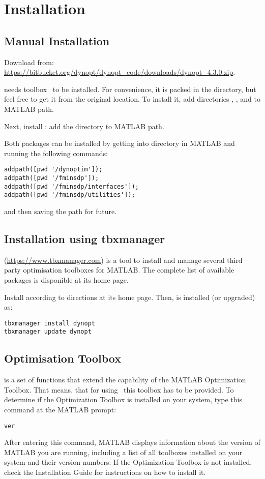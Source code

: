 \section{Installation}
\label{sec:instdynopt}

\subsection{Manual Installation}
Download  from:\\
\url{https://bitbucket.org/dynopt/dynopt_code/downloads/dynopt_4.3.0.zip}. 

 needs  toolbox~\citep{fminsdp} to be
installed. For convenience, it is packed in the 
directory, but feel free to get it from the original location. To
install it, add directories ,
, and  to MATLAB path.

Next, install : add the directory  to
MATLAB path. 

Both packages can be installed by getting into 
directory in MATLAB and running the following commands:
\begin{verbatim}
addpath([pwd '/dynoptim']);
addpath([pwd '/fminsdp']);
addpath([pwd '/fminsdp/interfaces']);
addpath([pwd '/fminsdp/utilities']);
\end{verbatim}
and then saving the path for future.

\subsection{Installation using tbxmanager}
 (\url{https://www.tbxmanager.com}) is a tool to
install and manage several third party optimisation toolboxes for
MATLAB.  The complete list of available packages is disponible at its
home page.

Install  according to directions at its home
page. Then,  is installed (or upgraded) as:
\begin{verbatim}
tbxmanager install dynopt
tbxmanager update dynopt
\end{verbatim}

\subsection{Optimisation Toolbox}
 is a set of functions that extend the capability of the
MATLAB Optimization Toolbox. That means, that for using~
this toolbox has to be provided. To determine if the Optimization
Toolbox is installed on your system, type this command at the MATLAB
prompt:
\begin{verbatim}
ver
\end{verbatim}
After entering this command, MATLAB displays information about the
version of MATLAB you are running, including a list of all toolboxes
installed on your system and their version numbers.  If the
Optimization Toolbox is not installed, check the Installation Guide
for instructions on how to install it.

